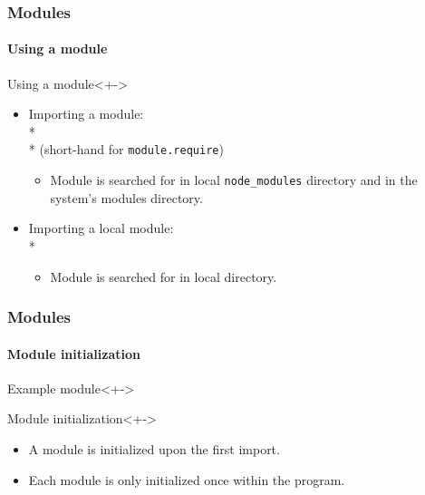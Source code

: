 \begin{frame}
	\frametitle{Modules}
    \framesubtitle{Using a module}

	\begin{block}{Using a module}<+->
		\begin{itemize}[<+-| highlight@+>]
            \item Importing a module: \\*  \\* (short-hand for \texttt{module.require})
            \begin{itemize}[<+-| highlight@+>]
                \item Module is searched for in local \texttt{node\_modules} directory and in the system's modules directory.
            \end{itemize}
            \item Importing a local module: \\* 
            \begin{itemize}[<+-| highlight@+>]
                \item Module is searched for in local directory.
            \end{itemize}
		\end{itemize}
	\end{block}
\end{frame}


\begin{frame}
	\frametitle{Modules}
    \framesubtitle{Module initialization}

	\begin{block}{Example module}<+->
		
	\end{block}

	\begin{block}{Module initialization}<+->
		\begin{itemize}[<+-| highlight@+>]
            \item A module is initialized upon the first import.
            \item Each module is only \alert{initialized once} within the program.
		\end{itemize}
	\end{block}
\end{frame}


